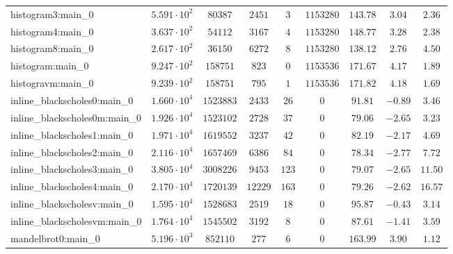 \begin{tabular}{|l|c|c|c|c|c|c|c|c|}
histogram3:main\_0             & $ 5.591 \cdot 10^{2} $ & $ 80387    $ & $ 2451   $ & $ 3    $ & $ 1153280  $ & $ 143.78      $ & $ 3.04    $ & $ 2.36    $ \\
histogram4:main\_0             & $ 3.637 \cdot 10^{2} $ & $ 54112    $ & $ 3167   $ & $ 4    $ & $ 1153280  $ & $ 148.77      $ & $ 3.28    $ & $ 2.38    $ \\
histogram8:main\_0             & $ 2.617 \cdot 10^{2} $ & $ 36150    $ & $ 6272   $ & $ 8    $ & $ 1153280  $ & $ 138.12      $ & $ 2.76    $ & $ 4.50    $ \\
histogram:main\_0              & $ 9.247 \cdot 10^{2} $ & $ 158751   $ & $ 823    $ & $ 0    $ & $ 1153536  $ & $ 171.67      $ & $ 4.17    $ & $ 1.89    $ \\
histogravm:main\_0             & $ 9.239 \cdot 10^{2} $ & $ 158751   $ & $ 795    $ & $ 1    $ & $ 1153536  $ & $ 171.82      $ & $ 4.18    $ & $ 1.69    $ \\
inline\_blackscholes0:main\_0  & $ 1.660 \cdot 10^{4} $ & $ 1523883  $ & $ 2433   $ & $ 26   $ & $ 0        $ & $ 91.81       $ & $ -0.89   $ & $ 3.46    $ \\
inline\_blackscholes0m:main\_0 & $ 1.926 \cdot 10^{4} $ & $ 1523102  $ & $ 2728   $ & $ 37   $ & $ 0        $ & $ 79.06       $ & $ -2.65   $ & $ 3.23    $ \\
inline\_blackscholes1:main\_0  & $ 1.971 \cdot 10^{4} $ & $ 1619552  $ & $ 3237   $ & $ 42   $ & $ 0        $ & $ 82.19       $ & $ -2.17   $ & $ 4.69    $ \\
inline\_blackscholes2:main\_0  & $ 2.116 \cdot 10^{4} $ & $ 1657469  $ & $ 6386   $ & $ 84   $ & $ 0        $ & $ 78.34       $ & $ -2.77   $ & $ 7.72    $ \\
inline\_blackscholes3:main\_0  & $ 3.805 \cdot 10^{4} $ & $ 3008226  $ & $ 9453   $ & $ 123  $ & $ 0        $ & $ 79.07       $ & $ -2.65   $ & $ 11.50   $ \\
inline\_blackscholes4:main\_0  & $ 2.170 \cdot 10^{4} $ & $ 1720139  $ & $ 12229  $ & $ 163  $ & $ 0        $ & $ 79.26       $ & $ -2.62   $ & $ 16.57   $ \\
inline\_blackscholesv:main\_0  & $ 1.595 \cdot 10^{4} $ & $ 1528683  $ & $ 2519   $ & $ 18   $ & $ 0        $ & $ 95.87       $ & $ -0.43   $ & $ 3.14    $ \\
inline\_blackscholesvm:main\_0 & $ 1.764 \cdot 10^{4} $ & $ 1545502  $ & $ 3192   $ & $ 8    $ & $ 0        $ & $ 87.61       $ & $ -1.41   $ & $ 3.59    $ \\
mandelbrot0:main\_0            & $ 5.196 \cdot 10^{3} $ & $ 852110   $ & $ 277    $ & $ 6    $ & $ 0        $ & $ 163.99      $ & $ 3.90    $ & $ 1.12    $ \\

\end{tabular}
